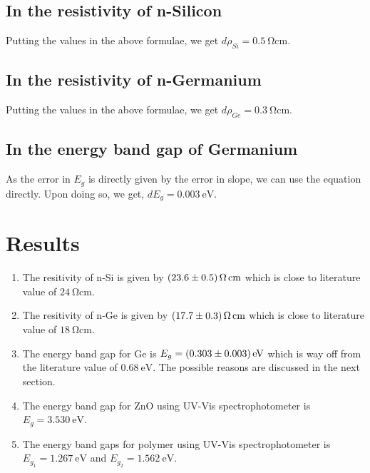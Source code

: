 \documentclass[%
 aip,
 amsmath,amssymb,
 reprint,%
]{revtex4-1}
\begin{document}
\subsection{In the resistivity of n-Silicon}
Putting the values in the above formulae, we get $d \rho_{Si} = \SI{0.5}{\ohm \centi \metre}$.
\subsection{In the resistivity of n-Germanium}
Putting the values in the above formulae, we get $d \rho_{Ge} = \SI{0.3}{\ohm \centi \metre}$.
\subsection{In the energy band gap of Germanium}
As the error in $E_g$ is directly given by the error in slope, we can use the equation directly. Upon doing so, we get, $d E_g = \SI{0.003}{\electronvolt}$.



\section{Results}
\begin{enumerate}
    \item The resitivity of n-Si is given by $\SI[separate-uncertainty=true]{23.6 \pm 0.5}{\ohm \centi \metre}$ which is close to literature value of $\SI{24}{\ohm \centi \metre}$.
    \item The resitivity of n-Ge is given by $\SI[separate-uncertainty=true]{17.7 \pm 0.3}{\ohm \centi \metre}$ which is close to literature value of $\SI{18}{\ohm \centi \metre}$.
    \item The energy band gap for Ge is $E_g = \SI[separate-uncertainty=true]{0.303 \pm 0.003}{\electronvolt}$ which is way off from the literature value of $\SI{0.68}{\electronvolt}$. The possible reasons are discussed in the next section.
    \item The energy band gap for ZnO using UV-Vis spectrophotometer is $E_g = \SI{3.530}{\electronvolt}$.
    \item The energy band gaps for polymer using UV-Vis spectrophotometer is $E_{g_1} = \SI{1.267}{\electronvolt}$ and $E_{g_2} = \SI{1.562}{\electronvolt}$.
\end{enumerate}
\end{document}
